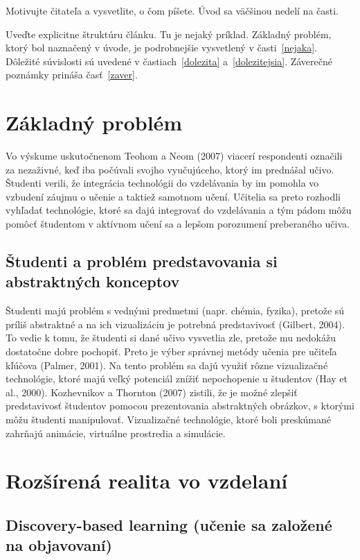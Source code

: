 \documentclass[10pt,twoside,slovak,a4paper]{article}
\begin{document}
Motivujte čitateľa a vysvetlite, o čom píšete. Úvod sa väčšinou nedelí na časti.

Uveďte explicitne štruktúru článku. Tu je nejaký príklad.
Základný problém, ktorý bol naznačený v úvode, je podrobnejšie vysvetlený v časti~\ref{nejaka}.
Dôležité súvislosti sú uvedené v častiach~\ref{dolezita} a~\ref{dolezitejsia}.
Záverečné poznámky prináša časť~\ref{zaver}.



\section{Základný problém} \label{rozsirenaRealita}
Vo výskume uskutočnenom Teohom a Neom (2007) viacerí respondenti označili za nezaživné, keď iba počúvali svojho vyučujúceho, ktorý im prednášal učivo.
Študenti verili, že integrácia technológii do vzdelávania by im pomohla vo vzbudení záujmu o učenie a taktiež samotnom učení. 
Učitelia sa preto rozhodli vyhľadať technológie, ktoré sa dajú integrovať do vzdelávania a tým pádom môžu pomôcť študentom v aktívnom učení sa a lepšom porozumení preberaného učiva.\cite{Saidin2015}
\subsection{Študenti a problém predstavovania si abstraktných konceptov} \label{rozsirenaRealita:abstraktneKoncepty}
Študenti majú problém s vednými predmetmi (napr. chémia, fyzika), pretože sú príliš abstraktné a na ich vizualizáciu je potrebná predstavivosť (Gilbert, 2004).
To vedie k tomu, že študenti si dané učivo vysvetlia zle, pretože mu nedokážu dostatočne dobre pochopiť.
Preto je výber správnej metódy učenia pre učiteľa kľúčova (Palmer, 2001).
Na tento problém sa dajú využiť rôzne vizualizačné technológie, ktoré majú veľký potenciál znížiť nepochopenie u študentov (Hay et al., 2000).
Kozhevnikov a Thornton (2007) zistili, že je možné zlepšiť predstavivosť študentov pomocou prezentovania abstraktných obrázkov, s ktorými môžu študenti manipulovať.
Vizualizačné technológie, ktoré boli preskúmané zahrňajú animácie, virtuálne prostredia a simulácie.

\section{Rozšírená realita vo vzdelaní} \label{rozsirenaVzdelanie}

\subsection{Discovery-based learning (učenie sa založené na objavovaní)} \label{rozsirenaVzdelanie:dbl}
\end{document}
